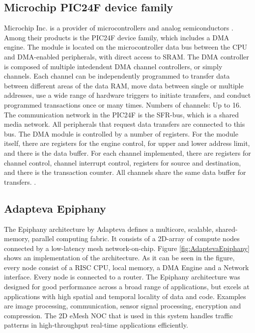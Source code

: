 \subsection{Microchip PIC24F device family}
Microchip Inc. is a provider of microcontrollers and analog semiconductors \cite{microchip1}.
Among their products is the PIC24F device family, which includes a DMA engine.
The module is located on the microcontroller data bus between the CPU and DMA-enabled peripherals, with direct access to SRAM.
The DMA controller is composed of multiple intedendent DMA channel controllers, or simply channels.
Each channel can be independently programmed to transfer data between different areas of the data RAM, move data between single or multiple addresses, use a wide range of hardware triggers to initiate transfers, and conduct programmed transactions once or many times. 
Numbers of channels: Up to 16.
The communication network in the PIC24F is the SFR-bus, which is a shared media network.
All peripherals that request data transfers are connected to this bus.
The DMA module is controlled by a number of registers.
For the module itself, there are registers for the engine control, for upper and lower address limit, and there is the data buffer.
For each channel implemented, there are registers for channel control, channel interrupt control, registers for source and destination, and there is the transaction counter. 
All channels share the same data buffer for transfers.
\cite{microchip54}.


\subsection{Adapteva Epiphany}
The Epiphany architecture by Adapteva \cite{epiphany} defines a multicore, scalable, shared-memory, parallel computing fabric.
It consists of a 2D-array of compute nodes connected by a low-latency mesh network-on-chip.
Figure \ref{fig:AdaptevaEpiphany} shows an implementation of the architecture.
As it can be seen in the figure, every node consist of a RISC CPU, local memory, a DMA Engine and a Network interface.
Every node is connected to a router.
The Epiphany architecture was designed for good performance across a broad range of applications, but excels at applications with high spatial and temporal locality of data and code.
Examples are image processing, communication, sensor signal processing, encryption and compression.
The 2D eMesh NOC that is used in this system handles traffic patterns in high-throughput real-time applications efficiently.

